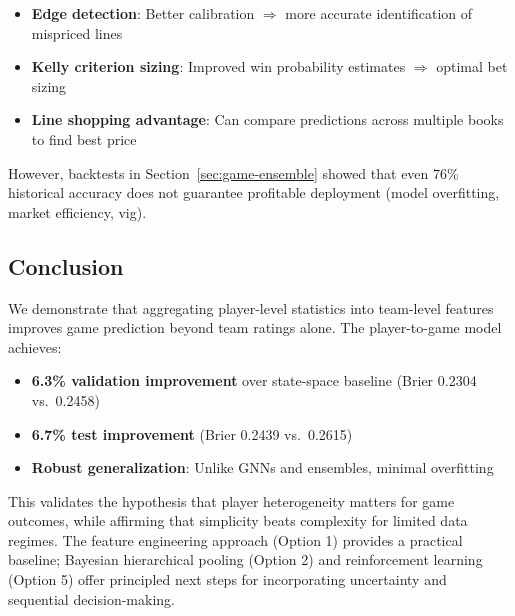 \begin{itemize}
    \item \textbf{Edge detection}: Better calibration $\Rightarrow$ more accurate identification of mispriced lines
    \item \textbf{Kelly criterion sizing}: Improved win probability estimates $\Rightarrow$ optimal bet sizing
    \item \textbf{Line shopping advantage}: Can compare predictions across multiple books to find best price
\end{itemize}

However, backtests in Section~\ref{sec:game-ensemble} showed that even 76\% historical accuracy does not guarantee profitable deployment (model overfitting, market efficiency, vig).

\subsection{Conclusion}

We demonstrate that aggregating player-level statistics into team-level features improves game prediction beyond team ratings alone. The player-to-game model achieves:

\begin{itemize}
    \item \textbf{6.3\% validation improvement} over state-space baseline (Brier 0.2304 vs.\ 0.2458)
    \item \textbf{6.7\% test improvement} (Brier 0.2439 vs.\ 0.2615)
    \item \textbf{Robust generalization}: Unlike GNNs and ensembles, minimal overfitting
\end{itemize}

This validates the hypothesis that player heterogeneity matters for game outcomes, while affirming that simplicity beats complexity for limited data regimes. The feature engineering approach (Option 1) provides a practical baseline; Bayesian hierarchical pooling (Option 2) and reinforcement learning (Option 5) offer principled next steps for incorporating uncertainty and sequential decision-making.
